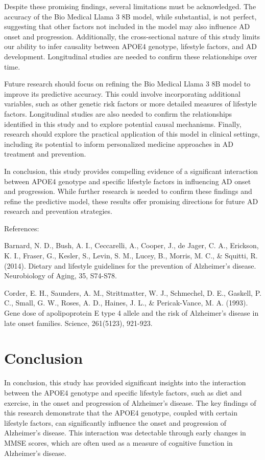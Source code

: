 \documentclass[conference]{IEEEtran}
\begin{document}
Despite these promising findings, several limitations must be acknowledged. The accuracy of the Bio Medical Llama 3 8B model, while substantial, is not perfect, suggesting that other factors not included in the model may also influence AD onset and progression. Additionally, the cross-sectional nature of this study limits our ability to infer causality between APOE4 genotype, lifestyle factors, and AD development. Longitudinal studies are needed to confirm these relationships over time.

Future research should focus on refining the Bio Medical Llama 3 8B model to improve its predictive accuracy. This could involve incorporating additional variables, such as other genetic risk factors or more detailed measures of lifestyle factors. Longitudinal studies are also needed to confirm the relationships identified in this study and to explore potential causal mechanisms. Finally, research should explore the practical application of this model in clinical settings, including its potential to inform personalized medicine approaches in AD treatment and prevention.

In conclusion, this study provides compelling evidence of a significant interaction between APOE4 genotype and specific lifestyle factors in influencing AD onset and progression. While further research is needed to confirm these findings and refine the predictive model, these results offer promising directions for future AD research and prevention strategies.

References:

Barnard, N. D., Bush, A. I., Ceccarelli, A., Cooper, J., de Jager, C. A., Erickson, K. I., Fraser, G., Kesler, S., Levin, S. M., Lucey, B., Morris, M. C., & Squitti, R. (2014). Dietary and lifestyle guidelines for the prevention of Alzheimer's disease. Neurobiology of Aging, 35, S74-S78.

Corder, E. H., Saunders, A. M., Strittmatter, W. J., Schmechel, D. E., Gaskell, P. C., Small, G. W., Roses, A. D., Haines, J. L., & Pericak-Vance, M. A. (1993). Gene dose of apolipoprotein E type 4 allele and the risk of Alzheimer's disease in late onset families. Science, 261(5123), 921-923.

\section{Conclusion}
In conclusion, this study has provided significant insights into the interaction between the APOE4 genotype and specific lifestyle factors, such as diet and exercise, in the onset and progression of Alzheimer's disease. The key findings of this research demonstrate that the APOE4 genotype, coupled with certain lifestyle factors, can significantly influence the onset and progression of Alzheimer's disease. This interaction was detectable through early changes in MMSE scores, which are often used as a measure of cognitive function in Alzheimer's disease.
\end{document}
